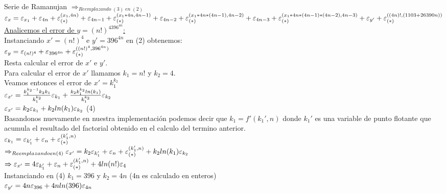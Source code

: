 \begin{subsection}{Serie de Ramanujan}
	$\Rightarrow_{Reemplazando \; (3) \; en \; (2)}$\\
	
	$\varepsilon _{x} = \varepsilon _{x_1}+\varepsilon _{4n}+\varepsilon _{({*})}^{({x_1,4n})}+\varepsilon _{4n-1}+\varepsilon _{({*})}^{({x_1*4n,4n-1})}+\varepsilon _{4n-2}+\varepsilon _{({*})}^{({x_1*4n*(4n-1),4n-2})}+\varepsilon _{4n-3}+\varepsilon _{({*})}^{({x_1*4n*(4n-1)*(4n-2),4n-3})}+\varepsilon _{y'}+\varepsilon _{({*})}^{({(4n)!,(1103+26390n)})}$\\
	
	\underline{Analicemos el error de $y=(n!)^4396^{4n}$:}\\
	
	Instanciando $x'=(n!)^4$ e $y'=396^{4n}$ en (2) obtenemos:\\
	
	$\varepsilon _{y} = {\varepsilon _{(n!)^4}+\varepsilon _{396^{4n}}+\varepsilon _{({*})}^{({(n!)^4,396^{4n}})}}$\\
	
	Resta calcular el error de $x'$ e $y'$.\\
	
	Para calcular el error de $x'$ llamamos $k_1=n!$ y $k_2=4$.\\

	Veamos entonces el error de $x'=k_1^{k_2}$\\
	
	$\texttt{$\varepsilon _{x'}$}=\frac{k_1^{k_2-1}k_2k_1}{k_1^{k_2}}\varepsilon _{k_1}+\frac{k_2k_1^{k_2}ln(k_1)}{k_1^{k_2}}\varepsilon _{k_2}$\\
	
	$\texttt{$\varepsilon _{x'}$}=k_2\varepsilon _{k_1}+k_2ln(k_1)\varepsilon _{k_2}$	(4)\\
		
	Basandonos nuevamente en nuestra implementación podemos decir que $k_1=f'(k_1',n)$ donde $k_1'$ es una variable de punto flotante que acumula el resultado del factorial obtenido en el calculo del termino anterior.\\

	$\varepsilon _{k_1}=\varepsilon _{k_1'}+\varepsilon _{n}+\varepsilon _{({*})}^{({k_1',n})}$\\
	
	$\Rightarrow_{Reemplazando en (4)} \texttt{$\varepsilon _{x'}$}=k_2\varepsilon _{k_1'}+\varepsilon _{n}+\varepsilon _{({*})}^{({k_1',n})}+k_2ln(k_1)\varepsilon _{k_2}$\\
	
	$\Rightarrow \texttt{$\varepsilon _{x'}$}=4\varepsilon _{k_1'}+\varepsilon _{n}+\varepsilon _{({*})}^{({k_1',n})}+4ln(n!)\varepsilon _{4}$\\
	
	Instanciando en (4) $k_1=396$ y $k_2=4n$ (4n es calculado en enteros)\\
	
	$\varepsilon _{y'}={4n\varepsilon _{396}+4nln(396)\varepsilon _{4n}}$\\
	

\end{subsection}
